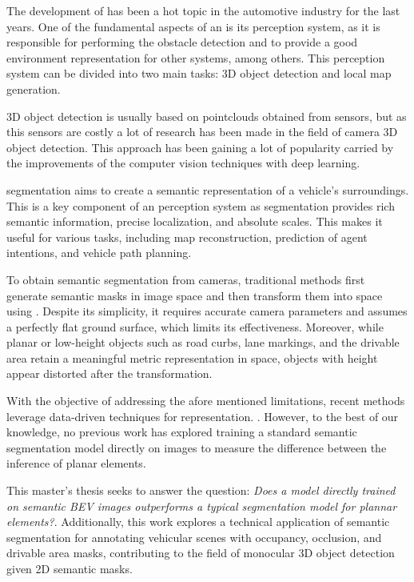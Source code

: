 
The development of  has been a hot topic in the automotive industry for the last years. One of the fundamental aspects of an  is its perception system, as it is responsible for performing the obstacle detection and to provide a good environment representation for other systems, among others. This perception system can be divided into two main tasks: 3D object detection and local  map generation. 

3D object detection is usually based on pointclouds obtained from  sensors, but as this sensors are costly a lot of research has been made in the field of camera 3D object detection. This approach has been gaining a lot of popularity carried by the improvements of the computer vision techniques with deep learning.

 segmentation aims to create a semantic representation of a vehicle's surroundings. This is a key component of an  perception system as  segmentation provides rich semantic information, precise localization, and absolute scales. This makes it useful for various tasks, including map reconstruction, prediction of agent intentions, and vehicle path planning.

To obtain  semantic segmentation from cameras, traditional methods first generate semantic masks in image space and then transform them into  space using . Despite its simplicity, it requires accurate camera parameters and assumes a perfectly flat ground surface, which limits its effectiveness. Moreover, while planar or low-height objects such as road curbs, lane markings, and the drivable area retain a meaningful metric representation in  space, objects with height appear distorted after the transformation.

With the objective of addressing the afore mentioned limitations, recent methods leverage data-driven techniques for  representation. \cite{view_parsing_network} \cite{lift_splat_shoot} \cite{m2bev}. However, to the best of our knowledge, no previous work has explored training a standard semantic segmentation model directly on  images to measure the difference between the inference of planar elements.

This master's thesis seeks to answer the question: \textit{Does a model directly trained on semantic BEV images outperforms a typical segmentation model for plannar elements?}. Additionally, this work explores a technical application of  semantic segmentation for annotating vehicular scenes with occupancy, occlusion, and drivable area masks, contributing to the field of monocular 3D object detection given 2D semantic masks.

